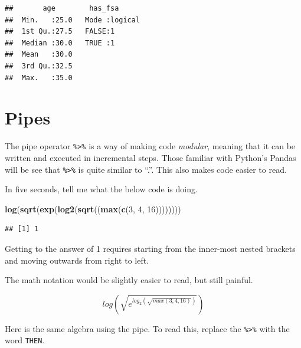 \documentclass[openany]{book}
\newenvironment{Shaded}{\begin{snugshade}}{\end{snugshade}}
\newcommand{\CommentTok}[1]{\textcolor[rgb]{0.56,0.35,0.01}{\textit{#1}}}
\newcommand{\DecValTok}[1]{\textcolor[rgb]{0.00,0.00,0.81}{#1}}
\newcommand{\KeywordTok}[1]{\textcolor[rgb]{0.13,0.29,0.53}{\textbf{#1}}}
\newcommand{\NormalTok}[1]{#1}
\newcommand{\OperatorTok}[1]{\textcolor[rgb]{0.81,0.36,0.00}{\textbf{#1}}}
\newcommand{\StringTok}[1]{\textcolor[rgb]{0.31,0.60,0.02}{#1}}
\begin{document}
\begin{verbatim}
##       age        has_fsa       
##  Min.   :25.0   Mode :logical  
##  1st Qu.:27.5   FALSE:1        
##  Median :30.0   TRUE :1        
##  Mean   :30.0                  
##  3rd Qu.:32.5                  
##  Max.   :35.0
\end{verbatim}

\hypertarget{pipes}{%
\section{Pipes}\label{pipes}}

The pipe operator \texttt{\%\textgreater{}\%} is a way of making code \emph{modular}, meaning that it can be written and executed in incremental steps. Those familiar with Python's Pandas will be see that \texttt{\%\textgreater{}\%} is quite similar to ``.''. This also makes code easier to read.

In five seconds, tell me what the below code is doing.

\begin{Shaded}
\begin{Highlighting}[]
\KeywordTok{log}\NormalTok{(}\KeywordTok{sqrt}\NormalTok{(}\KeywordTok{exp}\NormalTok{(}\KeywordTok{log2}\NormalTok{(}\KeywordTok{sqrt}\NormalTok{((}\KeywordTok{max}\NormalTok{(}\KeywordTok{c}\NormalTok{(}\DecValTok{3}\NormalTok{, }\DecValTok{4}\NormalTok{, }\DecValTok{16}\NormalTok{))))))))}
\end{Highlighting}
\end{Shaded}

\begin{verbatim}
## [1] 1
\end{verbatim}

Getting to the answer of 1 requires starting from the inner-most nested brackets and moving outwards from right to left.

The math notation would be slightly easier to read, but still painful.

\[log(\sqrt{e^{log_2(\sqrt{max(3,4,16)})}})\]

Here is the same algebra using the pipe. To read this, replace the \texttt{\%\textgreater{}\%} with the word \texttt{THEN}.

\begin{Shaded}
\end{Shaded}
\end{document}
